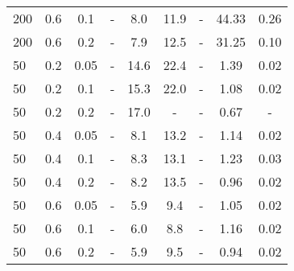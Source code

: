 \begin{tabular}{l c c c c c c c c }
200 & 0.6 & 0.1 & - & 8.0 & 11.9 & - & 44.33 & 0.26 \\
200 & 0.6 & 0.2 & - & 7.9 & 12.5 & - & 31.25 & 0.10 \\
50 & 0.2 & 0.05 & - & 14.6 & 22.4 & - & 1.39 & 0.02 \\
50 & 0.2 & 0.1 & - & 15.3 & 22.0 & - & 1.08 & 0.02 \\
50 & 0.2 & 0.2 & - & 17.0 & - & - & 0.67 & - \\
50 & 0.4 & 0.05 & - & 8.1 & 13.2 & - & 1.14 & 0.02 \\
50 & 0.4 & 0.1 & - & 8.3 & 13.1 & - & 1.23 & 0.03 \\
50 & 0.4 & 0.2 & - & 8.2 & 13.5 & - & 0.96 & 0.02 \\
50 & 0.6 & 0.05 & - & 5.9 & 9.4 & - & 1.05 & 0.02 \\
50 & 0.6 & 0.1 & - & 6.0 & 8.8 & - & 1.16 & 0.02 \\
50 & 0.6 & 0.2 & - & 5.9 & 9.5 & - & 0.94 & 0.02 \\
\hline
\end{tabular}
